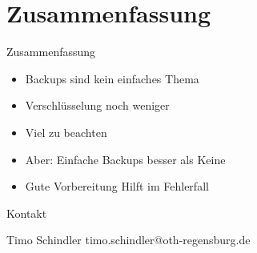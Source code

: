 \documentclass[10pt]{beamer}
\begin{document}
\section{Zusammenfassung}

%
%
\begin{frame}[fragile]{Zusammenfassung}
	\begin{itemize}
	\item Backups sind kein einfaches Thema
	\item Verschlüsselung noch weniger
	\item Viel zu beachten
	\item Aber: Einfache Backups besser als Keine
	\item Gute Vorbereitung Hilft im Fehlerfall
\end{itemize}
\end{frame}

%
%
\begin{frame}[fragile]{Kontakt}
	\begin{exampleblock}{Timo Schindler}
		timo.schindler@oth-regensburg.de
	\end{exampleblock}
\end{frame}
\end{document}
